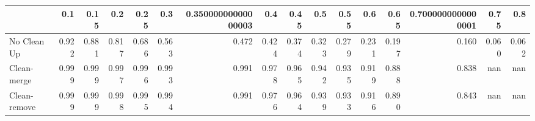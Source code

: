 \begin{tabular}{lrrrrrrrrrrrrrrr}
\toprule
{} &   0.1 &  0.15 &   0.2 &  0.25 &   0.3 & 0.35000000000000003 &   0.4 &  0.45 &   0.5 &  0.55 &   0.6 &  0.65 & 0.7000000000000001 &  0.75 &   0.8 \\
\midrule
No Clean Up  & 0.922 & 0.881 & 0.817 & 0.686 & 0.563 &               0.472 & 0.424 & 0.374 & 0.323 & 0.279 & 0.231 & 0.197 &              0.160 & 0.060 & 0.062 \\
Clean-merge  & 0.999 & 0.999 & 0.997 & 0.996 & 0.993 &               0.991 & 0.978 & 0.965 & 0.942 & 0.935 & 0.919 & 0.888 &              0.838 &   nan &   nan \\
Clean-remove & 0.999 & 0.999 & 0.998 & 0.995 & 0.994 &               0.991 & 0.976 & 0.964 & 0.939 & 0.933 & 0.916 & 0.890 &              0.843 &   nan &   nan \\
\bottomrule
\end{tabular}
